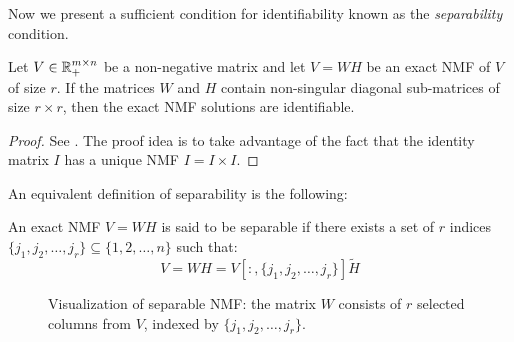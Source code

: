 Now we present a sufficient condition for identifiability known as the \textit{separability} condition.
\begin{theorem}
\label{Sufficient condition for identifiability}
Let $V \in \mathbb{R}_+^{m \times n}$ be a non-negative matrix and let $V = WH$ be an exact NMF of $V$ of size $r$.
If the matrices $W$ and $H$ contain non-singular diagonal sub-matrices of size $r \times r$, then the exact NMF solutions are identifiable.
\end{theorem}
\begin{proof}
    See \cite{donoho2003does}. The proof idea is to take advantage of the fact that the identity matrix $I$ has a unique NMF $I = I \times I$.
\end{proof}
An equivalent definition of separability is the following:
\begin{definition}
An exact NMF $V = WH$ is said to be separable if there exists a set of $r$ indices $\{j_1, j_2, \ldots, j_r\} \subseteq \{1, 2, \ldots, n\}$ such that:
\begin{equation}
    V = W H = V[:, \{j_1, j_2, \ldots, j_r\}]\tilde{H}
\end{equation}
\end{definition}
\begin{figure}[ht]
\centering
{}
\caption{Visualization of separable NMF: the matrix $W$ consists of $r$ selected columns from $V$, indexed by $\{j_1, j_2, \ldots, j_r\}$.}
\label{fig:separable_nmf}
\end{figure}
